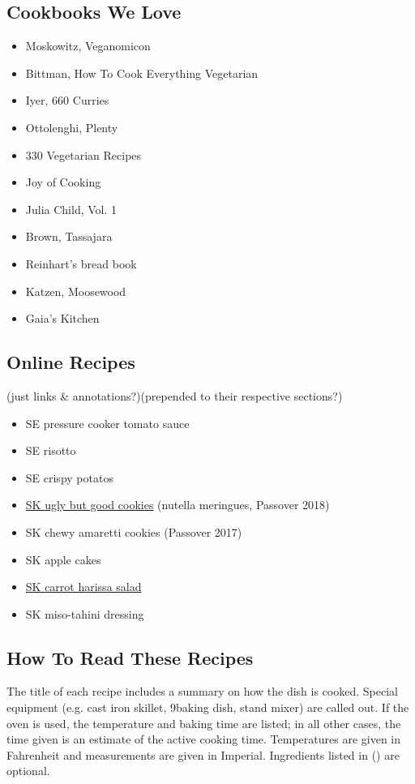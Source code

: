 \documentclass{article}
\begin{document}
\subsection{Cookbooks We Love}
\begin{itemize}
 \item Moskowitz, Veganomicon
 \item Bittman, How To Cook Everything Vegetarian
 \item Iyer, 660 Curries
 \item Ottolenghi, Plenty
 \item 330 Vegetarian Recipes
 \item Joy of Cooking
 \item Julia Child, Vol. 1
 \item Brown, Tassajara
 \item Reinhart’s bread book
 \item Katzen, Moosewood
 \item Gaia’s Kitchen
\end{itemize}

\subsection{Online Recipes}
(just links & annotations?)(prepended to their respective sections?)
\begin{itemize}
 \item SE pressure cooker tomato sauce
 \item SE risotto
 \item SE crispy potatos
 \item \href{https://smittenkitchen.com/2016/01/ugly-but-good-cookies/}{SK ugly but good cookies} (nutella meringues, Passover 2018)
 \item SK chewy amaretti cookies (Passover 2017)
 \item SK apple cakes
 \item \href{https://smittenkitchen.com/2010/05/carrot-salad-with-harissa-feta-and-mint/}{SK carrot harissa salad}
 \item SK miso-tahini dressing
\end{itemize}

\subsection{How To Read These Recipes}
The title of each recipe includes a summary on how the dish is cooked. Special equipment (e.g. cast iron skillet, 9\inch{}\inch baking dish, stand mixer) are called out. If the oven is used, the temperature and baking time are listed; in all other cases, the time given is an estimate of the active cooking time. Temperatures are given in Fahrenheit and measurements are given in Imperial. Ingredients listed in () are optional.
\end{document}
